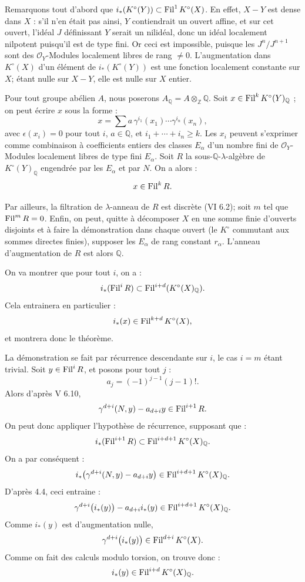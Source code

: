 Remarquons tout d'abord que \(i_*(K^\circ(Y))\subset \operatorname{Fil}^1K^\circ(X)\). En effet, \(X-Y\) est dense dans \(X\) : s'il n'en était pas ainsi, \(Y\) contiendrait un ouvert affine, et sur cet ouvert, l'idéal \(J\) définissant \(Y\) serait un nilidéal, donc un idéal localement nilpotent puisqu'il est de type fini. Or ceci est impossible, puisque les \(J^n/J^{n+1}\) sont des \(\mathcal O_Y\)-Modules localement libres de rang \(\ne0\). L'augmentation dans \(K^\circ(X)\) d'un élément de \(i_*(K^\circ(Y))\) est une fonction localement constante sur \(X\); étant nulle sur \(X-Y\), elle est nulle sur \(X\) entier.

Pour tout groupe abélien \(A\), nous poserons \(A_{\mathbb Q}=A\otimes_{\mathbb Z}\mathbb Q\). Soit \(x\in\operatorname{Fil}^kK^\circ(Y)_{\mathbb Q}\) ; on peut écrire \(x\) sous la forme :
\[
  x=\sum a\,\gamma^{i_1}(x_1)\cdots\gamma^{i_n}(x_n),
\]
avec \(\epsilon(x_i)=0\) pour tout \(i\), \(a\in\mathbb Q\), et \(i_1+\cdots+i_n\ge k\). Les \(x_i\) peuvent s'exprimer comme combinaison à coefficients entiers des classes \(E_\alpha\) d'un nombre fini de \(\mathcal O_Y\)-Modules localement libres de type fini \(E_\alpha\). Soit \(R\) la sous-\(\mathbb Q\)-\(\lambda\)-algèbre de \(K^\circ(Y)_{\mathbb Q}\) engendrée par les \(E_\alpha\) et par \(N\). On a alors :
\[
  x\in\operatorname{Fil}^kR.
\]

Par ailleurs, la filtration de \(\lambda\)-anneau de \(R\) est discrète (VI 6.2); soit \(m\) tel que \(\operatorname{Fil}^mR=0\). Enfin, on peut, quitte à décomposer \(X\) en une somme finie d'ouverts disjoints et à faire la démonstration dans chaque ouvert (le \(K^\circ\) commutant aux sommes directes finies), supposer les \(E_\alpha\) de rang constant \(r_\alpha\). L'anneau d'augmentation de \(R\) est alors \(\mathbb Q\).

On va
montrer que pour tout \(i\), on a :
\[
  i_*(\operatorname{Fil}^iR)\subset \operatorname{Fil}^{i+d}(K^\circ(X)_{\mathbb Q}).
\]
Cela entrainera en particulier :
\[
  i_*(x)\in\operatorname{Fil}^{k+d}K^\circ(X),
\]
et montrera donc le théorème.

La démonstration se fait par récurrence descendante sur \(i\), le cas \(i=m\) étant trivial. Soit \(y\in\operatorname{Fil}^iR\), et posons pour tout \(j\) :
\[
  a_j=(-1)^{j-1}(j-1)!.
\]
Alors d'après V 6.10,
\[
  \gamma^{d+i}(N,y)-a_{d+i}y\in\operatorname{Fil}^{i+1}R.
\]
On peut donc appliquer l'hypothèse de récurrence, supposant que :
\[
  i_*(\operatorname{Fil}^{i+1}R)\subset \operatorname{Fil}^{i+d+1}K^\circ(X)_{\mathbb Q}.
\]
On a par conséquent :
\[
  i_*\bigl(\gamma^{d+i}(N,y)-a_{d+i}y\bigr)
  \in\operatorname{Fil}^{i+d+1}K^\circ(X)_{\mathbb Q}.
\]
D'après 4.4, ceci entraine :
\[
  \gamma^{d+i}\bigl(i_*(y)\bigr)-a_{d+i}i_*(y)
  \in\operatorname{Fil}^{i+d+1}K^\circ(X)_{\mathbb Q}.
\]
Comme \(i_*(y)\) est d'augmentation nulle,
\[
  \gamma^{d+i}\bigl(i_*(y)\bigr)\in\operatorname{Fil}^{d+i}K^\circ(X).
\]
Comme on fait des calculs modulo torsion, on trouve donc :
\[
  i_*(y)\in\operatorname{Fil}^{i+d}K^\circ(X)_{\mathbb Q}.
\]


